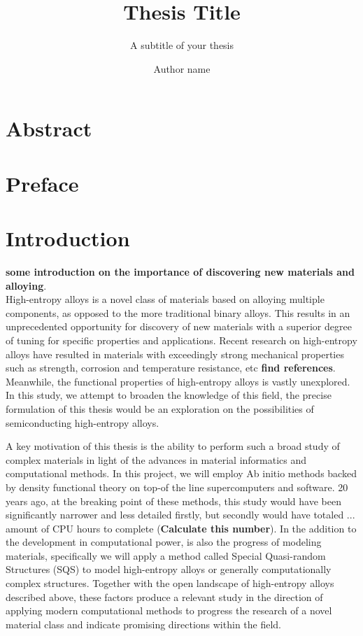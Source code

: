 \documentclass[UKenglish]{ifimaster}  %
\title{Thesis Title}        %
\subtitle{A subtitle of your thesis }         %
\author{Author name}                      %
\begin{document}
\duoforside[dept={Department Name <change at main.tex>},   %
  program={Master's Program Name <change at main.tex>},  %
  long]                                        %

\frontmatter{}  
\chapter*{Abstract}                   %

\tableofcontents{}
\listoffigures{}
\listoftables{}

\chapter*{Preface}                    %

\mainmatter{}

\chapter{Introduction}                  %

\textbf{some introduction on the importance of discovering new materials and alloying}.\\

High-entropy alloys is a novel class of materials based on alloying multiple components, as opposed to the more traditional binary alloys. This results in an unprecedented opportunity for discovery of new materials with a superior degree of tuning for specific properties and applications. Recent research on high-entropy alloys have resulted in materials with exceedingly strong mechanical properties such as strength, corrosion and temperature resistance, etc \textbf{find references}. Meanwhile, the functional properties of high-entropy alloys is vastly unexplored. In this study, we attempt to broaden the knowledge of this field, the precise formulation of this thesis would be an exploration on the possibilities of semiconducting high-entropy alloys. 

A key motivation of this thesis is the ability to perform such a broad study of complex materials in light of the advances in material informatics and computational methods. In this project, we will employ Ab initio methods backed by density functional theory on top-of the line supercomputers and software. 20 years ago, at the breaking point of these methods, this study would have been significantly narrower and less detailed firstly, but secondly would have totaled ... amount of CPU hours to complete (\textbf{Calculate this number}). In the addition to the development in computational power, is also the progress of modeling materials, specifically we will apply a method called Special Quasi-random Structures (SQS) to model high-entropy alloys or generally computationally complex structures. Together with the open landscape of high-entropy alloys described above, these factors produce a relevant study in the direction of applying modern computational methods to progress the research of a novel material class and indicate promising directions within the field.   
 
\end{document}

